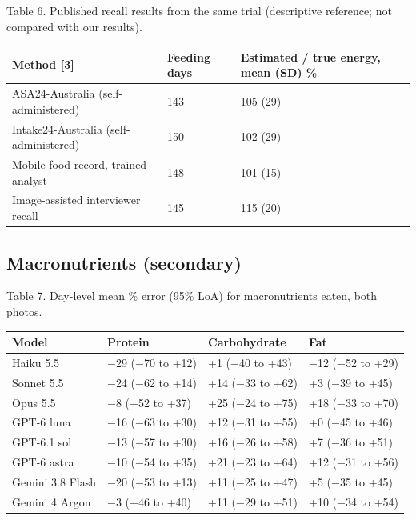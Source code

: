 \documentclass[
  11pt,
  letterpaper]{article}
\newcounter{none} %
\begin{document}
Table 6. Published recall results from the same trial (descriptive reference; not compared with our results).

{\def\LTcaptype{none} %
\begin{longtable}[]{@{}lll@{}}
\toprule\noalign{}
Method {[}3{]} & Feeding days & Estimated / true energy, mean (SD) \% \\
\midrule\noalign{}
\endhead
\bottomrule\noalign{}
\endlastfoot
ASA24-Australia (self-administered) & 143 & 105 (29) \\
Intake24-Australia (self-administered) & 150 & 102 (29) \\
Mobile food record, trained analyst & 148 & 101 (15) \\
Image-assisted interviewer recall & 145 & 115 (20) \\
\end{longtable}
}

\subsection{Macronutrients (secondary)}\label{macronutrients-secondary}

Table 7. Day-level mean \% error (95\% LoA) for macronutrients eaten, both photos.

{\def\LTcaptype{none} %
\begin{longtable}[]{@{}llll@{}}
\toprule\noalign{}
Model & Protein & Carbohydrate & Fat \\
\midrule\noalign{}
\endhead
\bottomrule\noalign{}
\endlastfoot
Haiku 5.5 & −29 (−70 to +12) & +1 (−40 to +43) & −12 (−52 to +29) \\
Sonnet 5.5 & −24 (−62 to +14) & +14 (−33 to +62) & +3 (−39 to +45) \\
Opus 5.5 & −8 (−52 to +37) & +25 (−24 to +75) & +18 (−33 to +70) \\
GPT-6 luna & −16 (−63 to +30) & +12 (−31 to +55) & +0 (−45 to +46) \\
GPT-6.1 sol & −13 (−57 to +30) & +16 (−26 to +58) & +7 (−36 to +51) \\
GPT-6 astra & −10 (−54 to +35) & +21 (−23 to +64) & +12 (−31 to +56) \\
Gemini 3.8 Flash & −20 (−53 to +13) & +11 (−25 to +47) & +5 (−35 to +45) \\
Gemini 4 Argon & −3 (−46 to +40) & +11 (−29 to +51) & +10 (−34 to +54) \\
\end{longtable}
}
\end{document}
